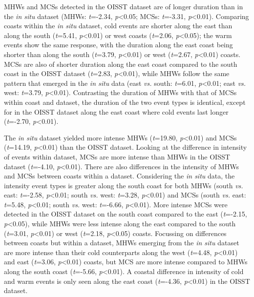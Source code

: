 \documentclass[a4paper,10pt,review]{elsarticle}
\begin{document}
MHWs and MCSs detected in the OISST dataset are of longer duration than in the \emph{in situ} dataset (MHWs: \emph{t}=-2.34, \emph{p}<0.05; MCSs: \emph{t}=-3.31, \emph{p}<0.01). Comparing coasts within the \emph{in situ} dataset, cold events are shorter along the east than along the south (\emph{t}=5.41, \emph{p}<0.01) or west coasts (\emph{t}=2.06, \emph{p}<0.05); the warm events show the same response, with the duration along the east coast being shorter than along the south (\emph{t}=3.79, \emph{p}<0.01) or west (\emph{t}=2.67, \emph{p}<0.01) coasts. MCSs are also of shorter duration along the east coast compared to the south coast in the OISST dataset (\emph{t}=2.83, \emph{p}<0.01), while MHWs follow the same pattern that emerged in the \emph{in situ} data (east \emph{vs.} south: \emph{t}=6.01, \emph{p}<0.01; east \emph{vs.} west: \emph{t}=3.79, \emph{p}<0.01). Contrasting the duration of MHWs with that of MCSs within coast and dataset, the duration of the two event types is identical, except for in the OISST dataset along the east coast where cold events last longer (\emph{t}=-2.70, \emph{p}<0.01).

The \emph{in situ} dataset yielded more intense MHWs (\emph{t}=19.80, \emph{p}<0.01) and MCSs (\emph{t}=14.19, \emph{p}<0.01) than the OISST dataset. Looking at the difference in intensity of events within dataset, MCSs are more intense than MHWs in the OISST dataset (\emph{t}=-4.10, \emph{p}<0.01). There are also differences in the intensity of MHWs and MCSs between coasts within a dataset. Considering the \emph{in situ} data, the intensity event types is greater along the south coast for both MHWs (south \emph{vs.} east: \emph{t}=-2.58, \emph{p}<0.01; south \emph{vs.} west: \emph{t}=3.28, \emph{p}<0.01) and MCSs (south \emph{vs.} east: \emph{t}=5.48, \emph{p}<0.01; south \emph{vs.} west: \emph{t}=-6.66, \emph{p}<0.01). More intense MCSs were detected in the OISST dataset on the south coast compared to the east (\emph{t}=-2.15, \emph{p}<0.05), while MHWs were less intense along the east compared to the south (\emph{t}=3.01, \emph{p}<0.01) or west (\emph{t}=2.18, \emph{p}<0.05) coasts. Focussing on differences between coasts but within a dataset, MHWs emerging from the \emph{in situ} dataset are more intense than their cold counterparts along the west (\emph{t}=4.48, \emph{p}<0.01) and east (\emph{t}=3.06, \emph{p}<0.01) coasts, but MCS are more intense compared to MHWs along the south coast (\emph{t}=-5.66, \emph{p}<0.01). A coastal difference in intensity of cold and warm events is only seen along the east coast (\emph{t}=-4.36, \emph{p}<0.01) in the OISST dataset.
\end{document}

